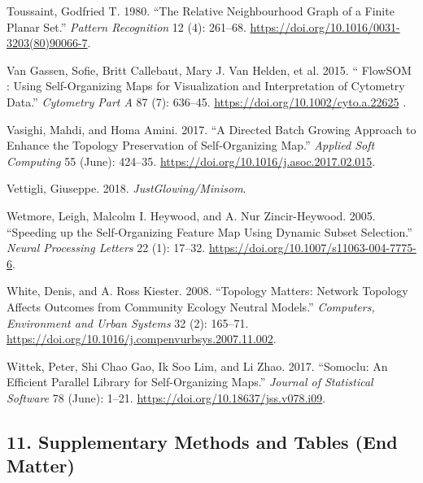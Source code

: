 \documentclass[
]{article}
\newlength{\cslhangindent}
\newenvironment{CSLReferences}[2] %
 {\begin{list}{}{%
  \setlength{\itemindent}{0pt}
  \setlength{\leftmargin}{0pt}
  \setlength{\parsep}{0pt}
  \ifodd #1
   \setlength{\leftmargin}{\cslhangindent}
   \setlength{\itemindent}{-1\cslhangindent}
  \fi
  \setlength{\itemsep}{#2\baselineskip}}}
 {\end{list}}
\providecommand{\DIFadd}[1]{{\protect\color{blue} #1}} %
\providecommand{\DIFaddbegin}{} %
\providecommand{\DIFaddend}{} %
\begin{document}
\begin{CSLReferences}{1}{1}
Toussaint, Godfried T. 1980. {``The Relative Neighbourhood Graph of a
Finite Planar Set.''} \emph{Pattern Recognition} 12 (4): 261--68.
\url{https://doi.org/10.1016/0031-3203(80)90066-7}.

\DIFaddbegin {}
\DIFadd{Van Gassen, Sofie, Britt Callebaut, Mary J. Van Helden, et al. 2015.
}{\DIFadd{``}{\DIFadd{FlowSOM}}\DIFadd{: }{\DIFadd{Using}} \DIFadd{Self-Organizing Maps for Visualization and
Interpretation of Cytometry Data.''}} \DIFadd{\emph{Cytometry Part A} 87 (7):
636--45. }\url{https://doi.org/10.1002/cyto.a.22625}\DIFadd{.
}

\DIFaddend {}
Vasighi, Mahdi, and Homa Amini. 2017. {``A Directed Batch Growing
Approach to Enhance the Topology Preservation of Self-Organizing Map.''}
\emph{Applied Soft Computing} 55 (June): 424--35.
\url{https://doi.org/10.1016/j.asoc.2017.02.015}.

Vettigli, Giuseppe. 2018. \emph{{JustGlowing}/Minisom}.

Wetmore, Leigh, Malcolm I. Heywood, and A. Nur Zincir-Heywood. 2005.
{``Speeding up the {Self-Organizing Feature Map Using Dynamic Subset
Selection}.''} \emph{Neural Processing Letters} 22 (1): 17--32.
\url{https://doi.org/10.1007/s11063-004-7775-6}.

White, Denis, and A. Ross Kiester. 2008. {``Topology Matters: {Network}
Topology Affects Outcomes from Community Ecology Neutral Models.''}
\emph{Computers, Environment and Urban Systems} 32 (2): 165--71.
\url{https://doi.org/10.1016/j.compenvurbsys.2007.11.002}.

Wittek, Peter, Shi Chao Gao, Ik Soo Lim, and Li Zhao. 2017. {``Somoclu:
{An Efficient Parallel Library} for {Self-Organizing Maps}.''}
\emph{Journal of Statistical Software} 78 (June): 1--21.
\url{https://doi.org/10.18637/jss.v078.i09}.

\end{CSLReferences}

\subsection{11. Supplementary \DIFaddbegin \DIFadd{Methods and }\DIFaddend Tables (End
Matter)} \DIFaddbegin \label{supplementary-methods-and-tables-end-matter}
\DIFaddend
\end{document}
